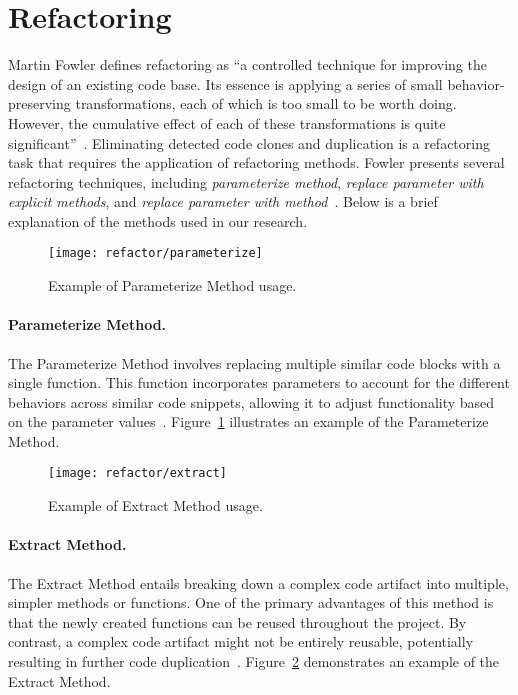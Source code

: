\en

\section{Refactoring}

Martin Fowler defines refactoring as ``a controlled technique for improving the design
of an existing code base. Its essence is applying a series of small
behavior-preserving transformations, each of which is too small to be worth
doing. However, the cumulative effect of each of these transformations is quite
significant''~\citep{refactorbook}. Eliminating detected code clones and
duplication is a refactoring task that requires the application of refactoring
methods. Fowler presents several refactoring techniques, including
\textit{parameterize method}, \textit{replace parameter with explicit methods},
and \textit{replace parameter with method}~\citep{refactorbook}. Below is a
brief explanation of the methods used in our research.

\begin{figure}[ht]
\texttt{[image: refactor/parameterize]}
\caption{Example of Parameterize Method usage.}
\label{fig:parameter}
\end{figure}

\paragraph{Parameterize Method.}
The Parameterize Method involves replacing multiple similar code blocks with a
single function. This function incorporates parameters to account for the
different behaviors across similar code snippets, allowing it to adjust
functionality based on the parameter values~\citep{refactorbook}.
Figure~\ref{fig:parameter} illustrates an example of the Parameterize Method.


\begin{figure}[ht]
\texttt{[image: refactor/extract]}
\caption{Example of Extract Method usage.}
\label{fig:extract}
\end{figure}


\paragraph{Extract Method.}
The Extract Method entails breaking down a complex code artifact into multiple,
simpler methods or functions. One of the primary advantages of this method is
that the newly created functions can be reused throughout the project. By
contrast, a complex code artifact might not be entirely reusable, potentially
resulting in further code duplication~\citep{refactorbook}.
Figure~\ref{fig:extract} demonstrates an example of the Extract Method.

